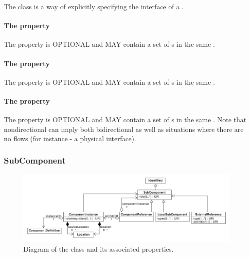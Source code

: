 The  class is a way of explicitly specifying the interface of a . 

\paragraph{The  property}
\label{sec:input:Interface}
The  property is OPTIONAL and MAY contain a set of  s in the same .
\paragraph{The  property}
\label{sec:output:Interface}
The  property is OPTIONAL and MAY contain a set of  s in the same .

\paragraph{The  property}
\label{sec:nondirectional:Interface}
The  property is OPTIONAL and MAY contain a set of  s in the same . Note that nondirectional can imply both bidirectional as well as situations where there are no flows (for instance - a physical interface).


\subsubsection{SubComponent}
\label{sec:SubComponent}

\begin{figure}[ht]
\begin{center}
\includegraphics[width=\textwidth]{uml/subcomponent}
\caption[]{Diagram of the  class and its associated properties.}
\label{uml:subcomponent}
\end{center}
\end{figure}

